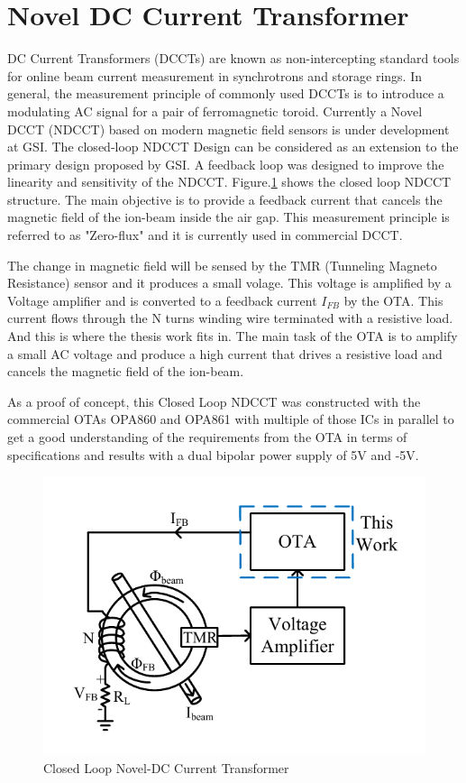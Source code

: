 \vfill
\clearpage

\section{Novel DC Current Transformer}

DC Current Transformers (DCCTs) are known as  non-intercepting  standard  tools  for online beam current measurement in synchrotrons and storage rings. In general, the measurement principle of commonly used DCCTs is to introduce a modulating AC signal for a pair of ferromagnetic toroid. Currently a Novel DCCT (NDCCT) based on modern magnetic field sensors is under development at GSI. The closed-loop NDCCT Design can be considered as an extension to the primary design proposed by GSI. A feedback loop was designed to improve the linearity and sensitivity of the NDCCT. Figure.\ref{fig:HRDCCT} shows the closed loop NDCCT structure. The main objective is to provide a feedback current that cancels the magnetic field of the ion-beam inside the air gap. This measurement principle is referred to as "Zero-flux" and it is currently used in commercial DCCT.

The change in magnetic field will be sensed by the TMR (Tunneling Magneto Resistance) sensor and it produces a small volage. This voltage is amplified by a Voltage amplifier and is converted to a feedback current $I_{FB}$ by the OTA. This current flows through the N turns winding wire terminated with a resistive load. And this is where the thesis work fits in. The main task of the OTA is to amplify a small AC voltage and produce a high current that drives a resistive load and cancels the magnetic field of the ion-beam.

As a proof of concept, this Closed Loop NDCCT was constructed with the commercial OTAs OPA860 and OPA861 with multiple of those ICs in parallel to get a good understanding of the requirements from the OTA in terms of specifications and results with a dual bipolar power supply of 5V and -5V.

\begin{figure} [H]
\centering
\includegraphics[scale=1]{Figures/System_Level/HRDCCT.pdf}
\caption{Closed Loop Novel-DC Current Transformer}
\label{fig:HRDCCT}
\end{figure}

